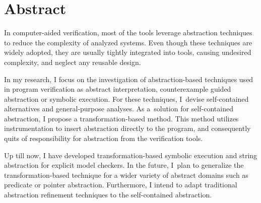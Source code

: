 \chapter*{Abstract}

In computer-aided verification, most of the tools leverage abstraction techniques to reduce the complexity of analyzed systems. Even though these techniques are widely adopted, they are usually tightly integrated into tools, causing undesired complexity, and neglect any reusable design.

In my research, I focus on the investigation of abstraction-based techniques used in program verification as abstract interpretation, counterexample guided abstraction or symbolic execution. For these techniques, I~devise self-contained alternatives and general-purpose analyses. As a~solution for self-contained abstraction, I propose a transformation-based method.
This method utilizes instrumentation to insert abstraction directly to the program, and consequently quits of responsibility for abstraction from the verification tools.

Up till now, I have developed transformation-based symbolic execution and string abstraction for explicit model checkers. In the future, I~plan to generalize the transformation-based technique for a wider variety of abstract domains such as predicate or pointer abstraction. Furthermore, I intend to adapt traditional abstraction refinement techniques to the self-contained abstraction.
